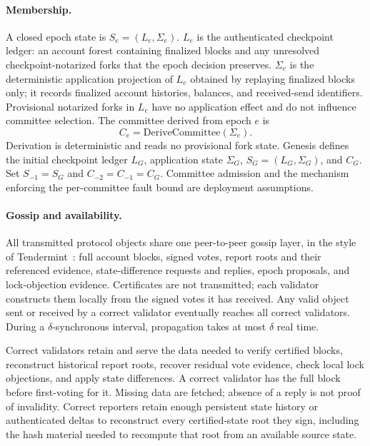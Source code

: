 \documentclass[10pt,twocolumn]{article}
\newcommand{\DeriveCommittee}{\mathrm{DeriveCommittee}}
\begin{document}
\paragraph{Membership.} A closed epoch state is $S_e=(L_e,\Sigma_e)$. $L_e$ is the authenticated checkpoint ledger: an account forest containing finalized blocks and any unresolved checkpoint-notarized forks that the epoch decision preserves. $\Sigma_e$ is the deterministic application projection of $L_e$ obtained by replaying finalized blocks only; it records finalized account histories, balances, and received-send identifiers. Provisional notarized forks in $L_e$ have no application effect and do not influence committee selection. The committee derived from epoch $e$ is
\begin{equation}
C_e = \DeriveCommittee(\Sigma_e).
\end{equation}
Derivation is deterministic and reads no provisional fork state. Genesis defines the initial checkpoint ledger $L_G$, application state $\Sigma_G$, $S_G=(L_G,\Sigma_G)$, and $C_G$. Set $S_{-1}=S_G$ and $C_{-2}=C_{-1}=C_G$. Committee admission and the mechanism enforcing the per-committee fault bound are deployment assumptions.

\paragraph{Gossip and availability.} All transmitted protocol objects share one peer-to-peer gossip layer, in the style of Tendermint~\cite{Tendermint}: full account blocks, signed votes, report roots and their referenced evidence, state-difference requests and replies, epoch proposals, and lock-objection evidence. Certificates are not transmitted; each validator constructs them locally from the signed votes it has received. Any valid object sent or received by a correct validator eventually reaches all correct validators. During a $\delta$-synchronous interval, propagation takes at most $\delta$ real time.

Correct validators retain and serve the data needed to verify certified blocks, reconstruct historical report roots, recover residual vote evidence, check local lock objections, and apply state differences. A correct validator has the full block before first-voting for it. Missing data are fetched; absence of a reply is not proof of invalidity. Correct reporters retain enough persistent state history or authenticated deltas to reconstruct every certified-state root they sign, including the hash material needed to recompute that root from an available source state.
\end{document}
